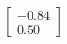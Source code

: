 \documentclass[preview]{standalone}
\begin{document}
\begin{align*}
\begin{bmatrix} -0.84 \\ 0.50 \end{bmatrix}
\end{align*}
\end{document}
